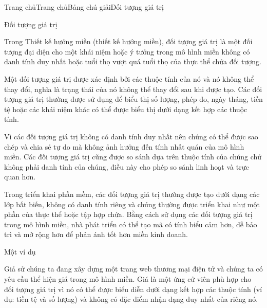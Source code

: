 







Trang chủTrang chủBảng chú giảiĐối tượng giá trị

Đối tượng giá trị

Trong Thiết kế hướng miền (thiết kế hướng miền), đối tượng giá trị là một đối tượng đại diện cho một khái niệm hoặc ý tưởng trong mô hình miền không có danh tính duy nhất hoặc tuổi thọ vượt quá tuổi thọ của thực thể chứa đối tượng.

Một đối tượng giá trị được xác định bởi các thuộc tính của nó và nó không thể thay đổi, nghĩa là trạng thái của nó không thể thay đổi sau khi được tạo. Các đối tượng giá trị thường được sử dụng để biểu thị số lượng, phép đo, ngày tháng, tiền tệ hoặc các khái niệm khác có thể được biểu thị dưới dạng kết hợp các thuộc tính.

Vì các đối tượng giá trị không có danh tính duy nhất nên chúng có thể được sao chép và chia sẻ tự do mà không ảnh hưởng đến tính nhất quán của mô hình miền. Các đối tượng giá trị cũng được so sánh dựa trên thuộc tính của chúng chứ không phải danh tính của chúng, điều này cho phép so sánh linh hoạt và trực quan hơn.

Trong triển khai phần mềm, các đối tượng giá trị thường được tạo dưới dạng các lớp bất biến, không có danh tính riêng và chúng thường được triển khai như một phần của thực thể hoặc tập hợp chứa. Bằng cách sử dụng các đối tượng giá trị trong mô hình miền, nhà phát triển có thể tạo mã có tính biểu cảm hơn, dễ bảo trì và mở rộng hơn để phản ánh tốt hơn miền kinh doanh.

Một ví dụ

Giả sử chúng ta đang xây dựng một trang web thương mại điện tử và chúng ta có yêu cầu thể hiện giá trong mô hình miền. Giá là một ứng cử viên phù hợp cho đối tượng giá trị vì nó có thể được biểu diễn dưới dạng kết hợp các thuộc tính (ví dụ: tiền tệ và số lượng) và không có đặc điểm nhận dạng duy nhất của riêng nó.

